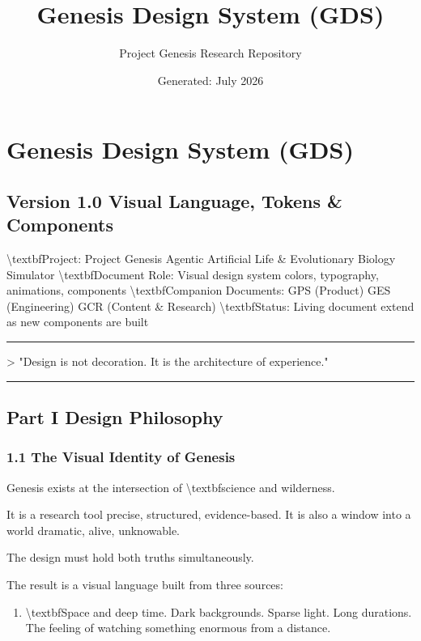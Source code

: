 \documentclass[11pt,a4paper]{article}
\title{\textbf{Genesis Design System (GDS)}}
\author{Project Genesis Research Repository}
\date{\small Generated: July 2026}
\begin{document}
\maketitle
\thispagestyle{empty}

\newpage
\section*{Genesis Design System (GDS)}
\subsection*{Version 1.0  Visual Language, Tokens \& Components}

\textbackslash{}textbf{Project:} Project Genesis  Agentic Artificial Life \& Evolutionary Biology Simulator
\textbackslash{}textbf{Document Role:} Visual design system  colors, typography, animations, components
\textbackslash{}textbf{Companion Documents:} GPS (Product)  GES (Engineering)  GCR (Content \& Research)
\textbackslash{}textbf{Status:} Living document  extend as new components are built

\noindent\rule{\textwidth}{0.4pt}

\textgreater{} "Design is not decoration. It is the architecture of experience."

\noindent\rule{\textwidth}{0.4pt}

\subsection*{Part I  Design Philosophy}

\subsubsection*{1.1 The Visual Identity of Genesis}

Genesis exists at the intersection of \textbackslash{}textbf{science and wilderness}.

It is a research tool  precise, structured, evidence-based.
It is also a window into a world  dramatic, alive, unknowable.

The design must hold both truths simultaneously.

The result is a visual language built from three sources:

\begin{enumerate}
  \item \textbackslash{}textbf{Space and deep time.} Dark backgrounds. Sparse light. Long durations. The feeling of watching something enormous from a distance.
\end{enumerate}
\end{document}
